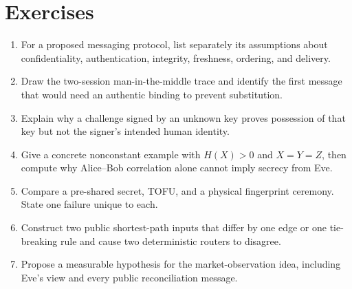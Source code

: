 \section{Exercises}

\begin{enumerate}
    \item For a proposed messaging protocol, list separately its assumptions
    about confidentiality, authentication, integrity, freshness, ordering, and
    delivery.
    \item Draw the two-session man-in-the-middle trace and identify the first
    message that would need an authentic binding to prevent substitution.
    \item Explain why a challenge signed by an unknown key proves possession
    of that key but not the signer's intended human identity.
    \item Give a concrete nonconstant example with $H(X)>0$ and $X=Y=Z$,
    then compute why Alice--Bob correlation alone cannot imply secrecy from
    Eve.
    \item Compare a pre-shared secret, TOFU, and a physical fingerprint
    ceremony.  State one failure unique to each.
    \item Construct two public shortest-path inputs that differ by one edge or
    one tie-breaking rule and cause two deterministic routers to disagree.
    \item Propose a measurable hypothesis for the market-observation idea,
    including Eve's view and every public reconciliation message.
\end{enumerate}

